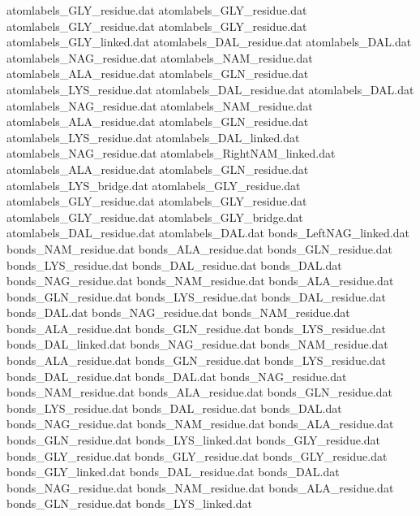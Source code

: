 atomlabels_GLY_residue.dat
atomlabels_GLY_residue.dat
atomlabels_GLY_residue.dat
atomlabels_GLY_residue.dat
atomlabels_GLY_linked.dat
atomlabels_DAL_residue.dat      
atomlabels_DAL.dat              
atomlabels_NAG_residue.dat      
atomlabels_NAM_residue.dat      
atomlabels_ALA_residue.dat      
atomlabels_GLN_residue.dat      
atomlabels_LYS_residue.dat      
atomlabels_DAL_residue.dat      
atomlabels_DAL.dat              
atomlabels_NAG_residue.dat      
atomlabels_NAM_residue.dat      
atomlabels_ALA_residue.dat      
atomlabels_GLN_residue.dat      
atomlabels_LYS_residue.dat      
atomlabels_DAL_linked.dat       
atomlabels_NAG_residue.dat      
atomlabels_RightNAM_linked.dat  
atomlabels_ALA_residue.dat      
atomlabels_GLN_residue.dat      
atomlabels_LYS_bridge.dat       
atomlabels_GLY_residue.dat
atomlabels_GLY_residue.dat
atomlabels_GLY_residue.dat
atomlabels_GLY_residue.dat
atomlabels_GLY_bridge.dat
atomlabels_DAL_residue.dat      
atomlabels_DAL.dat              
bonds_LeftNAG_linked.dat        
bonds_NAM_residue.dat           
bonds_ALA_residue.dat           
bonds_GLN_residue.dat           
bonds_LYS_residue.dat           
bonds_DAL_residue.dat           
bonds_DAL.dat                   
bonds_NAG_residue.dat           
bonds_NAM_residue.dat           
bonds_ALA_residue.dat           
bonds_GLN_residue.dat           
bonds_LYS_residue.dat           
bonds_DAL_residue.dat           
bonds_DAL.dat                   
bonds_NAG_residue.dat           
bonds_NAM_residue.dat           
bonds_ALA_residue.dat           
bonds_GLN_residue.dat           
bonds_LYS_residue.dat           
bonds_DAL_linked.dat            
bonds_NAG_residue.dat           
bonds_NAM_residue.dat           
bonds_ALA_residue.dat           
bonds_GLN_residue.dat           
bonds_LYS_residue.dat           
bonds_DAL_residue.dat           
bonds_DAL.dat                   
bonds_NAG_residue.dat           
bonds_NAM_residue.dat           
bonds_ALA_residue.dat           
bonds_GLN_residue.dat           
bonds_LYS_residue.dat           
bonds_DAL_residue.dat           
bonds_DAL.dat                   
bonds_NAG_residue.dat           
bonds_NAM_residue.dat           
bonds_ALA_residue.dat           
bonds_GLN_residue.dat           
bonds_LYS_linked.dat            
bonds_GLY_residue.dat
bonds_GLY_residue.dat
bonds_GLY_residue.dat
bonds_GLY_residue.dat
bonds_GLY_linked.dat
bonds_DAL_residue.dat           
bonds_DAL.dat                   
bonds_NAG_residue.dat           
bonds_NAM_residue.dat           
bonds_ALA_residue.dat           
bonds_GLN_residue.dat           
bonds_LYS_linked.dat            
